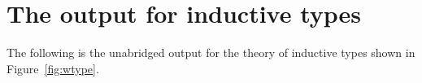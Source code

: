 \section{The output for inductive types}
\label{sec:outp-induct-types}

The following is the unabridged output for the theory of inductive
types shown in Figure~\ref{fig:wtype}.


